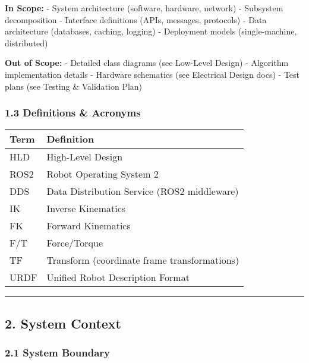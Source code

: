 \documentclass[
]{article}
\begin{document}
\textbf{In Scope:} - System architecture (software, hardware, network) -
Subsystem decomposition - Interface definitions (APIs, messages,
protocols) - Data architecture (databases, caching, logging) -
Deployment models (single-machine, distributed)

\textbf{Out of Scope:} - Detailed class diagrams (see Low-Level Design)
- Algorithm implementation details - Hardware schematics (see Electrical
Design docs) - Test plans (see Testing \& Validation Plan)

\hypertarget{definitions-acronyms}{%
\subsubsection{1.3 Definitions \& Acronyms}\label{definitions-acronyms}}

\begin{longtable}[]{@{}ll@{}}
\toprule\noalign{}
Term & Definition \\
\midrule\noalign{}
\endhead
\bottomrule\noalign{}
\endlastfoot
HLD & High-Level Design \\
ROS2 & Robot Operating System 2 \\
DDS & Data Distribution Service (ROS2 middleware) \\
IK & Inverse Kinematics \\
FK & Forward Kinematics \\
F/T & Force/Torque \\
TF & Transform (coordinate frame transformations) \\
URDF & Unified Robot Description Format \\
\end{longtable}

\begin{center}\rule{0.5\linewidth}{0.5pt}\end{center}

\hypertarget{system-context}{%
\subsection{2. System Context}\label{system-context}}

\hypertarget{system-boundary}{%
\subsubsection{2.1 System Boundary}\label{system-boundary}}
\end{document}
